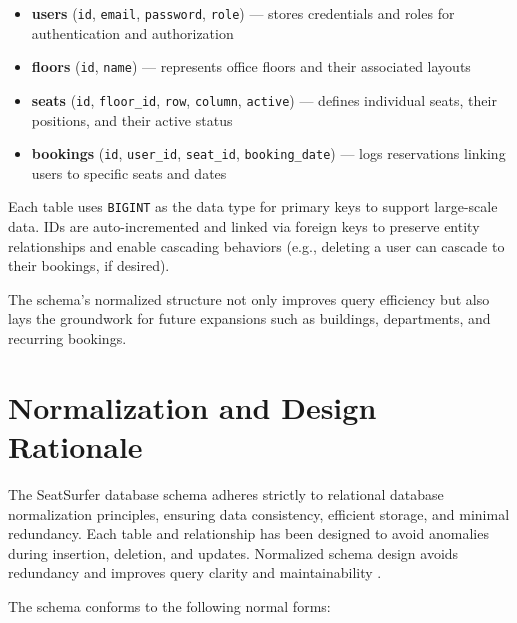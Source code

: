 \documentclass[12pt,a4paper]{report} %
\begin{document}
\begin{itemize}
    \item \textbf{users} (\texttt{id}, \texttt{email}, \texttt{password}, \texttt{role}) — stores credentials and roles for authentication and authorization
    \item \textbf{floors} (\texttt{id}, \texttt{name}) — represents office floors and their associated layouts
    \item \textbf{seats} (\texttt{id}, \texttt{floor\_id}, \texttt{row}, \texttt{column}, \texttt{active}) — defines individual seats, their positions, and their active status
    \item \textbf{bookings} (\texttt{id}, \texttt{user\_id}, \texttt{seat\_id}, \texttt{booking\_date}) — logs reservations linking users to specific seats and dates
\end{itemize}

Each table uses \texttt{BIGINT} as the data type for primary keys to support large-scale data. IDs are auto-incremented and linked via foreign keys to preserve entity relationships and enable cascading behaviors (e.g., deleting a user can cascade to their bookings, if desired).

The schema's normalized structure not only improves query efficiency but also lays the groundwork for future expansions such as buildings, departments, and recurring bookings.

\section{Normalization and Design Rationale}

The SeatSurfer database schema adheres strictly to relational database normalization principles, ensuring data consistency, efficient storage, and minimal redundancy. Each table and relationship has been designed to avoid anomalies during insertion, deletion, and updates. Normalized schema design avoids redundancy and improves query clarity and maintainability \cite{davis2021datamodeling}.

The schema conforms to the following normal forms:
\end{document}
